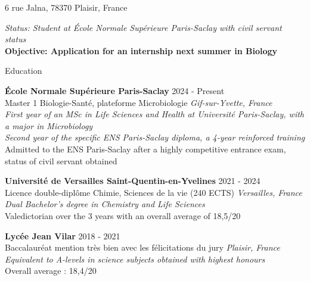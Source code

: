 \documentclass[
	10pt,
]{style} %
\begin{document}
\vspace{-0.25em}

\begin{center}
	6 rue Jalna, 78370 Plaisir, France \\
\end{center}

\begin{center}
	\textit{Status: Student at École Normale Supérieure Paris-Saclay with civil servant status} \\
	\textbf{Objective: Application for an internship next summer in Biology}
\end{center}


\begin{rSection}{Education}

	\textbf{École Normale Supérieure Paris-Saclay} \hfill 2024 - Present \\
	Master 1 Biologie-Santé, plateforme Microbiologie  \hfill \textit{Gif-sur-Yvette, France} \\
	\textit{First year of an MSc in Life Sciences and Health at Université Paris-Saclay, with a major in Microbiology} \\
	\textit{Second year of the specific ENS Paris-Saclay diploma, a 4-year reinforced training} \\
	Admitted to the ENS Paris-Saclay after a highly competitive entrance exam, status of civil servant obtained

	\vspace{0.5mm}

	\textbf{Université de Versailles Saint-Quentin-en-Yvelines} \hfill 2021 - 2024 \\
	Licence double-diplôme Chimie, Sciences de la vie (240 ECTS) \hfill \textit{Versailles, France} \\
	\textit{Dual Bachelor's degree in Chemistry and Life Sciences} \\
	Valedictorian over the 3 years with an overall average of 18,5/20

	\vspace{0.5mm}

	\textbf{Lycée Jean Vilar} \hfill 2018 - 2021 \\
	Baccalauréat mention très bien avec les félicitations du jury \hfill \textit{Plaisir, France} \\
	\textit{Equivalent to A-levels in science subjects obtained with highest honours} \\
	Overall average : 18,4/20
\end{rSection}
\end{document}
